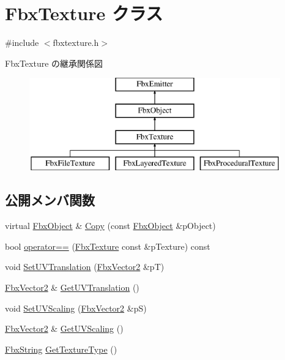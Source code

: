 \hypertarget{class_fbx_texture}{}\section{Fbx\+Texture クラス}
\label{class_fbx_texture}


{\ttfamily \#include $<$fbxtexture.\+h$>$}

Fbx\+Texture の継承関係図\begin{figure}[H]
\begin{center}
\leavevmode
\includegraphics[height=4.000000cm]{class_fbx_texture}
\end{center}
\end{figure}
\subsection*{公開メンバ関数}
\begin{DoxyCompactItemize}
\item 
virtual \hyperlink{class_fbx_object}{Fbx\+Object} \& \hyperlink{class_fbx_texture_a321c23c2dc2e91c58e2fcc2ed7d29f9e}{Copy} (const \hyperlink{class_fbx_object}{Fbx\+Object} \&p\+Object)
\item 
bool \hyperlink{class_fbx_texture_a65138a2a6eb3226ea7d3f0e9384c23a4}{operator==} (\hyperlink{class_fbx_texture}{Fbx\+Texture} const \&p\+Texture) const
\item 
void \hyperlink{class_fbx_texture_a25a79cb2fe825d4ab9eb85a43c8ae000}{Set\+U\+V\+Translation} (\hyperlink{class_fbx_vector2}{Fbx\+Vector2} \&pT)
\item 
\hyperlink{class_fbx_vector2}{Fbx\+Vector2} \& \hyperlink{class_fbx_texture_a091e91a0be7caf96f48a8f3fb3cb08d2}{Get\+U\+V\+Translation} ()
\item 
void \hyperlink{class_fbx_texture_ad27fe41d313171065fdeac6a111570cd}{Set\+U\+V\+Scaling} (\hyperlink{class_fbx_vector2}{Fbx\+Vector2} \&pS)
\item 
\hyperlink{class_fbx_vector2}{Fbx\+Vector2} \& \hyperlink{class_fbx_texture_a7b3d7fa85a447f0250555bb54f8d36b8}{Get\+U\+V\+Scaling} ()
\item 
\hyperlink{class_fbx_string}{Fbx\+String} \hyperlink{class_fbx_texture_ae671b7102a419f20687774bafee8058e}{Get\+Texture\+Type} ()
\end{DoxyCompactItemize}
